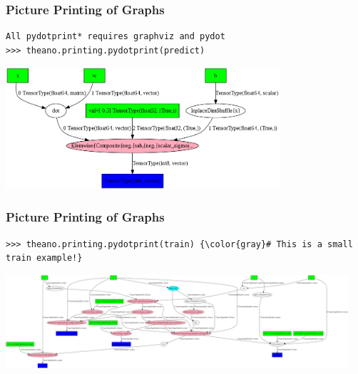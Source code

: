 \documentclass[a4paper,9pt]{beamer}
\begin{document}
\begin{frame}[fragile]
\frametitle{Picture Printing of Graphs}
\begin{Verbatim}
All pydotprint* requires graphviz and pydot
>>> theano.printing.pydotprint(predict)
\end{Verbatim}
\includegraphics[width=4in]{pics/logreg_pydotprint_predic.png}
\end{frame}

\begin{frame}[fragile]
\frametitle{Picture Printing of Graphs}
\begin{Verbatim}[commandchars=\\\{\}]
>>> theano.printing.pydotprint(train) {\color{gray}# This is a small train example!}
\end{Verbatim}
\hspace{-.8cm}
\includegraphics[width=5.0in]{pics/logreg_pydotprint_train.png}
\end{frame}
\end{document}
